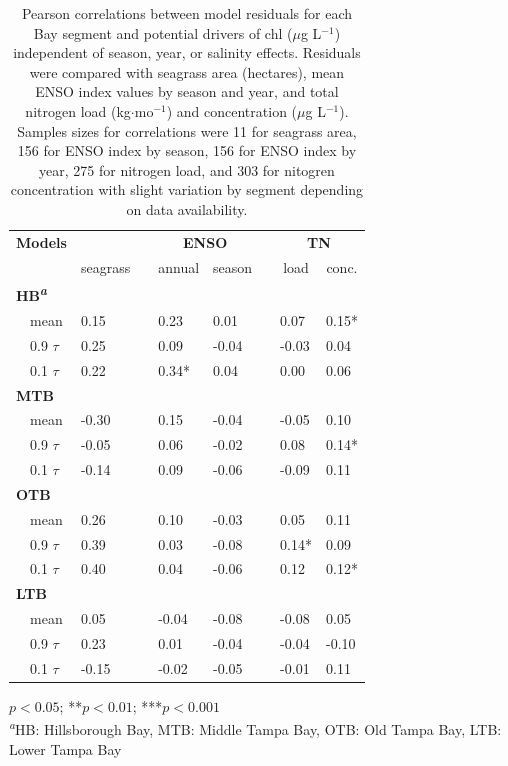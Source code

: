 \documentclass{svjour3}\usepackage[]{graphicx}\usepackage[]{color}
\newcommand{\mugl}{$\mu$g L$^{-1}$}
\begin{document}
\begin{table}[!tbp]
\caption{Pearson correlations between model residuals for each Bay segment and potential drivers of \ac{chl} (\mugl) independent of season, year, or salinity effects. Residuals were compared with seagrass area (hectares), mean ENSO index values by season and year, and total nitrogen load (kg$\cdot$mo$^{-1}$) and concentration (\mugl).  Samples sizes for correlations were 11 for seagrass area, 156 for ENSO index by season, 156 for ENSO index by year, 275 for nitrogen load, and 303 for nitogren concentration with slight variation by segment depending on data availability.\label{tab:cormat}} 
\begin{center}
\begin{tabular}{llcllcll}
\hline\hline
\multicolumn{1}{l}{\bfseries Models}&\multicolumn{1}{c}{\bfseries }&\multicolumn{1}{c}{\bfseries }&\multicolumn{2}{c}{\bfseries ENSO}&\multicolumn{1}{c}{\bfseries }&\multicolumn{2}{c}{\bfseries TN}\tabularnewline
\cline{4-5} \cline{7-8}
\multicolumn{1}{l}{}&\multicolumn{1}{c}{seagrass}&\multicolumn{1}{c}{}&\multicolumn{1}{c}{annual}&\multicolumn{1}{c}{season}&\multicolumn{1}{c}{}&\multicolumn{1}{c}{load}&\multicolumn{1}{c}{conc.}\tabularnewline
\hline
{\bfseries HB\textsuperscript{\textit{a}}}&&&&&&&\tabularnewline
~~mean&0.15 &&0.23 &0.01 &&0.07 &0.15*\tabularnewline
~~0.9 $\tau$&0.25 &&0.09 &-0.04 &&-0.03 &0.04 \tabularnewline
~~0.1 $\tau$&0.22 &&0.34*&0.04 &&0.00 &0.06 \tabularnewline
\hline
{\bfseries MTB}&&&&&&&\tabularnewline
~~mean&-0.30 &&0.15 &-0.04 &&-0.05 &0.10 \tabularnewline
~~0.9 $\tau$&-0.05 &&0.06 &-0.02 &&0.08 &0.14*\tabularnewline
~~0.1 $\tau$&-0.14 &&0.09 &-0.06 &&-0.09 &0.11 \tabularnewline
\hline
{\bfseries OTB}&&&&&&&\tabularnewline
~~mean&0.26 &&0.10 &-0.03 &&0.05 &0.11 \tabularnewline
~~0.9 $\tau$&0.39 &&0.03 &-0.08 &&0.14*&0.09 \tabularnewline
~~0.1 $\tau$&0.40 &&0.04 &-0.06 &&0.12 &0.12*\tabularnewline
\hline
{\bfseries LTB}&&&&&&&\tabularnewline
~~mean&0.05 &&-0.04 &-0.08 &&-0.08 &0.05 \tabularnewline
~~0.9 $\tau$&0.23 &&0.01 &-0.04 &&-0.04 &-0.10 \tabularnewline
~~0.1 $\tau$&-0.15 &&-0.02 &-0.05 &&-0.01 &0.11 \tabularnewline
\hline
\end{tabular}\end{center}

\footnotesize *$p<0.05$; **$p<0.01$; ***$p<0.001$\\\textsuperscript{\textit{a}}HB: Hillsborough Bay, MTB: Middle Tampa Bay, OTB: Old Tampa Bay, LTB: Lower Tampa Bay\end{table}
\end{document}
